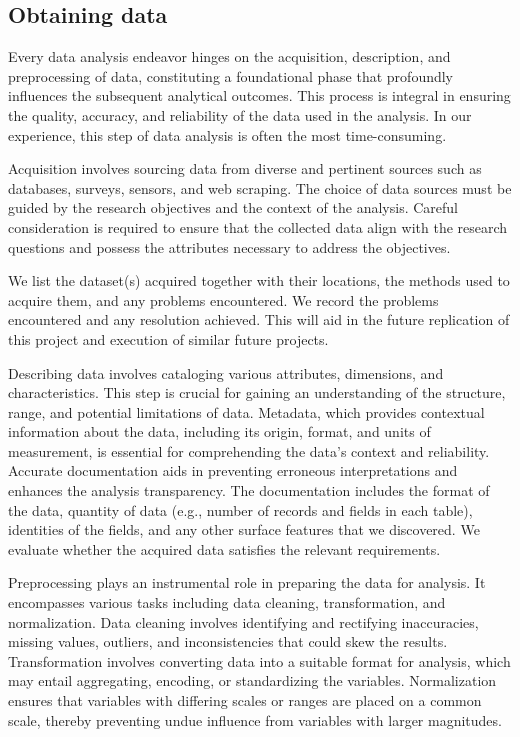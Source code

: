 \subsection{Obtaining data}
\label{sub:obtaining_data}


Every data analysis endeavor hinges on the acquisition, description, and preprocessing of data, constituting a foundational phase that profoundly influences the subsequent analytical outcomes. This process is integral in ensuring the quality, accuracy, and reliability of the data used in the analysis. In our experience, this step of data analysis is often the most time-consuming.

Acquisition involves sourcing data from diverse and pertinent sources such as databases, surveys, sensors, and web scraping. The choice of data sources must be guided by the research objectives and the context of the analysis. Careful consideration is required to ensure that the collected data align with the research questions and possess the attributes necessary to address the objectives.

We list the dataset(s) acquired together with their locations, the methods used to acquire them, and any problems encountered. We record the problems encountered and any resolution achieved. This will aid in the future replication of this project and execution of similar future projects.

Describing data involves cataloging various attributes, dimensions, and characteristics. This step is crucial for gaining an understanding of the structure, range, and potential limitations of data. Metadata, which provides contextual information about the data, including its origin, format, and units of measurement, is essential for comprehending the data's context and reliability. Accurate documentation aids in preventing erroneous interpretations and enhances the analysis transparency. The documentation includes the format of the data, quantity of data (e.g., number of records and fields in each table), identities of the fields, and any other surface features that we discovered. We evaluate whether the acquired data satisfies the relevant requirements.

Preprocessing plays an instrumental role in preparing the data for analysis. It encompasses various tasks including data cleaning, transformation, and normalization. Data cleaning involves identifying and rectifying inaccuracies, missing values, outliers, and inconsistencies that could skew the results. Transformation involves converting data into a suitable format for analysis, which may entail aggregating, encoding, or standardizing the variables. Normalization ensures that variables with differing scales or ranges are placed on a common scale, thereby preventing undue influence from variables with larger magnitudes.

